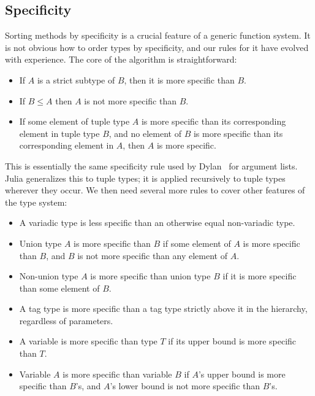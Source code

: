 
\subsection{Specificity}

Sorting methods by specificity is a crucial feature of a generic
function system.
It is not obvious how to order types by specificity, and our
rules for it have evolved with experience.
The core of the algorithm is straightforward:

\begin{itemize}
\item If $A$ is a strict subtype of $B$, then it is more specific than $B$.
\item If $B\leq A$ then $A$ is not more specific than $B$.
\item If some element of tuple type $A$ is more specific than its corresponding
element in tuple type $B$, and no element of $B$ is more specific than its
corresponding element in $A$, then $A$ is more specific.
\end{itemize}


This is essentially the same specificity rule used by Dylan~\cite{dylanlang}
for argument lists.
Julia generalizes this to tuple types; it is applied recursively to tuple
types wherever they occur.
We then need several more rules to cover other features of the type system:

\begin{itemize}
\item A variadic type is less specific than an otherwise equal non-variadic type.
\item Union type $A$ is more specific than $B$ if some element of $A$ is
more specific than $B$, and $B$ is not more specific than any
element of $A$.
\item Non-union type $A$ is more specific than union type $B$ if it is more specific
than some element of $B$.
\item A tag type is more specific than a tag type strictly above it in the
hierarchy, regardless of parameters.
\item A variable is more specific than type $T$ if its upper bound is more specific
than $T$.
\item Variable $A$ is more specific than variable $B$ if $A$'s upper bound is
more specific than $B$'s, and $A$'s lower bound is not more specific than $B$'s.
\end{itemize}

